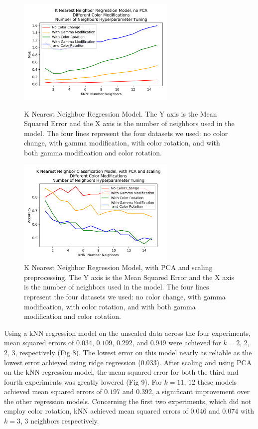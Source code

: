 \documentclass[journal]{IEEEtran}
\begin{document}
\begin{figure}
\centering
\includegraphics[height=2in]{KNN_reg_noPCA/knn_regression.png}
\caption{K Nearest Neighbor Regression Model. The Y axis is the Mean Squared Error and the X axis is the number of neighbors used in the model. The four lines represent the four datasets we used: no color change, with gamma modification, with color rotation, and with both gamma modification and color rotation.}
\label{Rknn}

\centering
\includegraphics[height=2in]{KNN_clf_PCA/knn_classification.png}
\caption{K Nearest Neighbor Regression Model, with PCA and scaling preprocessing. The Y axis is the Mean Squared Error and the X axis is the number of neighbors used in the model. The four lines represent the four datasets we used: no color change, with gamma modification, with color rotation, and with both gamma modification and color rotation.}
\label{Rknn_pca}
\end{figure}

Using a kNN regression model on the unscaled data across the four experiments, mean squared errors of $0.034$, $0.109$, $0.292$, and $0.949$ were achieved for $k=2$, $2$, $2$, $3$, respectively (Fig 8). The lowest error on this model nearly as reliable as the lowest error achieved using ridge regression ($0.033$). After scaling and using PCA on the kNN regression model, the mean squared error for both the third and fourth experiments was greatly lowered (Fig 9). For $k=11$, $12$ these models achieved mean squared errors of $0.197$ and $0.392$, a significant improvement over the other regression models. Concerning the first two experiments, which did not employ color rotation, kNN achieved mean squared errors of $0.046$ and $0.074$ with $k=3$, $3$ neighbors respectively.
\end{document}
